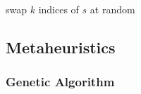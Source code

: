 \documentclass[a4paper,10pt]{article}
\begin{document}
\begin{algorithm}
\begin{algorithmic}
        \State swap $k$ indices of $s$ at random
    \EndProcedure
\end{algorithmic}
\end{algorithm}







\newpage
\subsection{Metaheuristics}


\subsubsection*{Genetic Algorithm}
\end{document}
